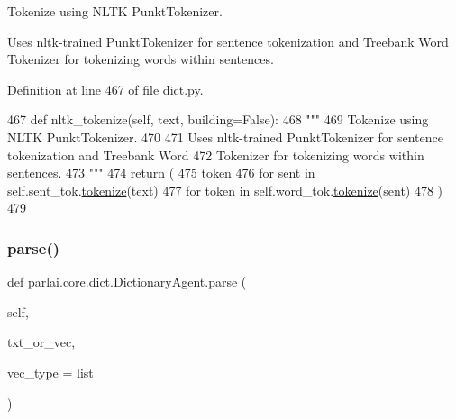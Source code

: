 \begin{DoxyVerb}Tokenize using NLTK PunktTokenizer.

Uses nltk-trained PunktTokenizer for sentence tokenization and Treebank Word
Tokenizer for tokenizing words within sentences.
\end{DoxyVerb}
 

Definition at line 467 of file dict.\+py.


\begin{DoxyCode}
467     \textcolor{keyword}{def }nltk\_tokenize(self, text, building=False):
468         \textcolor{stringliteral}{"""}
469 \textcolor{stringliteral}{        Tokenize using NLTK PunktTokenizer.}
470 \textcolor{stringliteral}{}
471 \textcolor{stringliteral}{        Uses nltk-trained PunktTokenizer for sentence tokenization and Treebank Word}
472 \textcolor{stringliteral}{        Tokenizer for tokenizing words within sentences.}
473 \textcolor{stringliteral}{        """}
474         \textcolor{keywordflow}{return} (
475             token
476             \textcolor{keywordflow}{for} sent \textcolor{keywordflow}{in} self.sent\_tok.\hyperlink{namespaceparlai_1_1agents_1_1tfidf__retriever_1_1build__tfidf_a1fdb457e98eb4e4c26047e229686a616}{tokenize}(text)
477             \textcolor{keywordflow}{for} token \textcolor{keywordflow}{in} self.word\_tok.\hyperlink{namespaceparlai_1_1agents_1_1tfidf__retriever_1_1build__tfidf_a1fdb457e98eb4e4c26047e229686a616}{tokenize}(sent)
478         )
479 
\end{DoxyCode}
\mbox{\label{classparlai_1_1core_1_1dict_1_1DictionaryAgent_ad34c4135329f6768d22d519c3c483d68}} 
\subsubsection{\texorpdfstring{parse()}{parse()}}
{\footnotesize\ttfamily def parlai.\+core.\+dict.\+Dictionary\+Agent.\+parse (\begin{DoxyParamCaption}\item[{}]{self,  }\item[{}]{txt\+\_\+or\+\_\+vec,  }\item[{}]{vec\+\_\+type = {\ttfamily list} }\end{DoxyParamCaption})}

